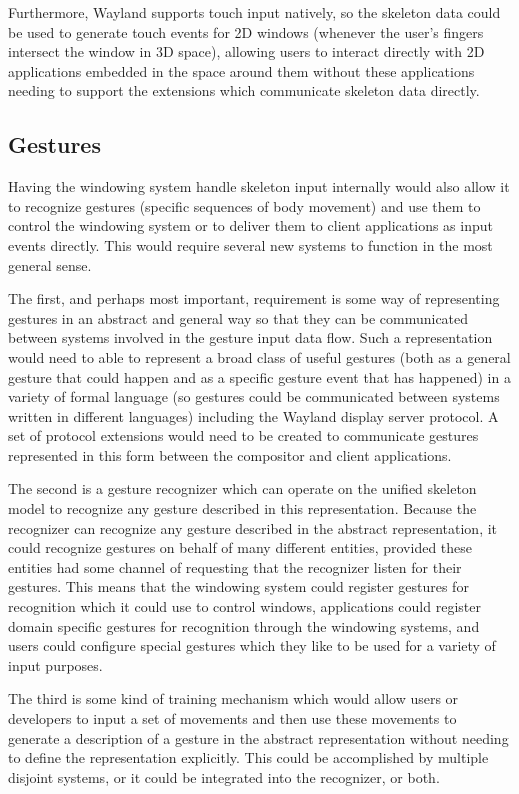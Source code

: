 Furthermore, Wayland supports touch input natively, so the skeleton data could be used to generate touch events for 2D windows (whenever the user's fingers intersect the window in 3D space), allowing users to interact directly with 2D applications embedded in the space around them without these applications needing to support the extensions which communicate skeleton data directly.

\subsection{Gestures}

Having the windowing system handle skeleton input internally would also allow it to recognize gestures (specific sequences of body movement) and use them to control the windowing system or to deliver them to client applications as input events directly. This would require several new systems to function in the most general sense. 

The first, and perhaps most important, requirement is some way of representing gestures in an abstract and general way so that they can be communicated between systems involved in the gesture input data flow. Such a representation would need to able to represent a broad class of useful gestures (both as a general gesture that could happen and as a specific gesture event that has happened) in a variety of formal language (so gestures could be communicated between systems written in different languages) including the Wayland display server protocol. A set of protocol extensions would need to be created to communicate gestures represented in this form between the compositor and client applications.

The second is a gesture recognizer which can operate on the unified skeleton model to recognize any gesture described in this representation. Because the recognizer can recognize any gesture described in the abstract representation, it could recognize gestures on behalf of many different entities, provided these entities had some channel of requesting that the recognizer listen for their gestures. This means that the windowing system could register gestures for recognition which it could use to control windows, applications could register domain specific gestures for recognition through the windowing systems, and users could configure special gestures which they like to be used for a variety of input purposes.

The third is some kind of training mechanism which would allow users or developers to input a set of movements and then use these movements to generate a description of a gesture in the abstract representation without needing to define the representation explicitly. This could be accomplished by multiple disjoint systems, or it could be integrated into the recognizer, or both.

